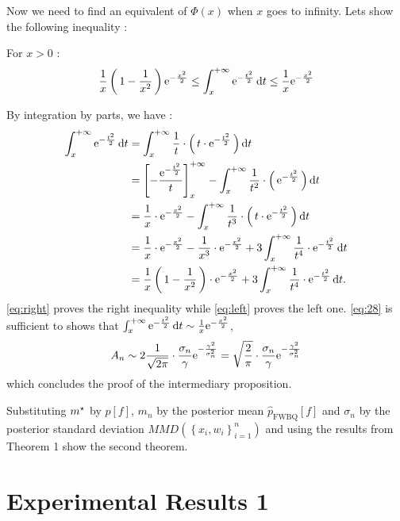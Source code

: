 Now we need to find an equivalent of $\Phi(x)$ when $x$ goes to infinity. Lets show the following inequality :
\begin{boxtheorem}
For $x>0$ :
\begin{equation}
  \label{eq:28}
  \frac{1}{x} \left( \, 1-\frac{1}{x^2} \, \right) \mathrm{e}^{-\frac{x^2}{2}}
  \leq \int_{x}^{+\infty} \mathrm{e}^{-\frac{t^2}{2}} \mathop{}\mathopen{}\mathrm{d}{}t
  \leq   \frac{1}{x}  \mathrm{e}^{-\frac{x^2}{2}}
\end{equation}
\end{boxtheorem}

\noindent
By integration by parts, we have :
\begin{align}
  \int_{x}^{+\infty} \mathrm{e}^{-\frac{t^2}{2}} \mathop{}\mathopen{}\mathrm{d}{}t &=
  \int_{x}^{+\infty} \frac{1}{t} \cdot \left( \, t\cdot \mathrm{e}^{-\frac{t^2}{2}} \, \right) \mathop{}\mathopen{}\mathrm{d}{}t \nonumber\\
  &= \left[ - \frac{\mathrm{e}^{-\frac{t^2}{2}}}{t} \right]_{x}^{+\infty}-
  \int_{x}^{+\infty} \frac{1}{t^2} \cdot \left( \, \mathrm{e}^{-\frac{t^2}{2}} \, \right) \mathop{}\mathopen{}\mathrm{d}{}t \nonumber\\
  &= \frac{1}{x}\cdot \mathrm{e}^{-\frac{x^2}{2}}- \int_{x}^{+\infty} \frac{1}{t^3} \cdot \left( \, t\cdot \mathrm{e}^{-\frac{t^2}{2}} \, \right) \mathop{}\mathopen{}\mathrm{d}{}t \label{eq:right}\\
  &= \frac{1}{x}\cdot \mathrm{e}^{-\frac{x^2}{2}} - \frac{1}{x^3}\cdot \mathrm{e}^{-\frac{x^2}{2}}
  + 3\int_{x}^{+\infty} \frac{1}{t^4} \cdot \mathrm{e}^{-\frac{t^2}{2}} \mathop{}\mathopen{}\mathrm{d}{}t \nonumber\\
  &= \frac{1}{x} \left( \, 1-\frac{1}{x^2} \, \right) \cdot \mathrm{e}^{-\frac{x^2}{2}} + 3\int_{x}^{+\infty} \frac{1}{t^4} \cdot \mathrm{e}^{-\frac{t^2}{2}} \mathop{}\mathopen{}\mathrm{d}{}t.\label{eq:left}
\end{align}
\noindent
\eqref{eq:right} proves the right inequality while \eqref{eq:left} proves the left one.
\noindent
\eqref{eq:28} is sufficient to shows that $\int_{x}^{+\infty} \mathrm{e}^{-\frac{t^2}{2}} \mathop{}\mathopen{}\mathrm{d}{}t \sim \frac{1}{x}  \mathrm{e}^{-\frac{x^2}{2}}$, \ie
\begin{equation*}
A_n \sim 2 \frac{1}{\sqrt{2\pi}} \cdot \frac{\sigma_n}{\gamma} \mathrm{e}^{-\frac{\gamma^2}{\sigma_n^2}}= \sqrt{\frac{2}{\pi}}\cdot \frac{\sigma_n}{\gamma} \mathrm{e}^{-\frac{\gamma^2}{\sigma_n^2}}
\end{equation*}
\noindent
which concludes the proof of the intermediary proposition.

\noindent
Substituting $\mopt$ by $p[f]$, $m_n$ by the posterior mean $\hat { p } _ { \mathrm { FWBQ } } [ f ]$ and $\sigma_n$ by the posterior standard deviation $M M D \left( \left\{ x _ { i } , w _ { i } \right\} _ { i = 1 } ^ { n } \right)$ and using the results
 from Theorem 1 show the second theorem.

\section{Experimental Results 1}
\label{sec:ER}

